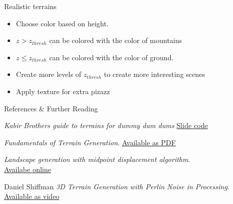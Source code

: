 \begin{frame}{Realistic terrains}
    \begin{itemize}
        \item<3-> Choose color based on height.
        \item<4-> $z > z_{thresh}$ can be colored with the color of mountains
        \item<5-> $z \le z_{thresh}$ can be colored with the color of ground.
        \item<6-> Create more levels of $z_{thresh}$ to create more interesting scenes
        \item<7-> Apply texture for extra pizazz
    \end{itemize}
\end{frame}

\begin{frame}{References \& Further Reading}
  \footnotesize
  \begin{thebibliography}{9}
    \textit{Kabir Brothers guide to terrains for dummy dum dums}
    \href{https://github.com/Irtiaz/TerrainGeneration} {Slide code}
  
    \textit{Fundamentals of Terrain Generation}.
    \href{https://www.cs.cmu.edu/~112/notes/student-tp-guides/Terrain.pdf}{Available as PDF}

    \textit{Landscape generation with midpoint displacement algorithm}.\\
    \href{https://bitesofcode.wordpress.com/2016/12/23/landscape-generation-using-midpoint-displacement/}{Availabe online}

    Daniel Shiffman
    \textit{3D Terrain Generation with Perlin Noise in Processing}.
    \\
    \href{https://www.youtube.com/watch?v=IKB1hWWedMk}{Available as video}

  \end{thebibliography}
\end{frame}

